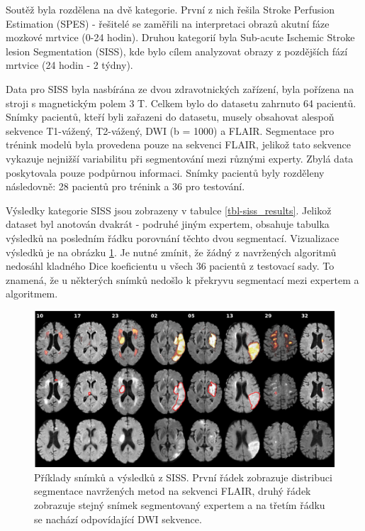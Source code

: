 \documentclass[11pt]{article}
\begin{document}
Soutěž byla rozdělena na dvě kategorie. První z nich řešila Stroke Perfusion Estimation (SPES) - řešitelé se zaměřili na interpretaci obrazů akutní fáze mozkové mrtvice (0-24 hodin). Druhou kategorií byla Sub-acute Ischemic Stroke lesion Segmentation (SISS), kde bylo cílem analyzovat obrazy z pozdějších fází mrtvice (24 hodin - 2 týdny).

Data pro SISS byla nasbírána ze dvou zdravotnických zařízení, byla pořízena na stroji s magnetickým polem 3 T. Celkem bylo do datasetu zahrnuto 64 pacientů. Snímky pacientů, kteří byli zařazeni do datasetu, musely obsahovat alespoň sekvence T1-vážený, T2-vážený, DWI (b = 1000) a FLAIR. Segmentace pro trénink modelů byla provedena pouze na sekvenci FLAIR, jelikož tato sekvence vykazuje nejnižší variabilitu při segmentování mezi různými experty. Zbylá data poskytovala pouze podpůrnou informaci. Snímky pacientů byly rozděleny následovně: 28 pacientů pro trénink a 36 pro testování.

Výsledky kategorie SISS jsou zobrazeny v tabulce \ref{tbl-siss_results}. Jelikož dataset byl anotován dvakrát - podruhé jiným expertem, obsahuje tabulka výsledků na posledním řádku porovnání těchto dvou segmentací. Vizualizace výsledků je na obrázku \ref{img-isles2015}. Je nutné zmínit, že žádný z navržených algoritmů nedosáhl kladného Dice koeficientu u všech 36 pacientů z testovací sady. To znamená, že u některých snímků nedošlo k překryvu segmentací mezi expertem a algoritmem.

\begin{figure}[htp]
	\centering
	\includegraphics[width=\textwidth]{isles2015}
	\caption{Příklady snímků a výsledků z SISS. První řádek zobrazuje distribuci segmentace navržených metod na sekvenci FLAIR, druhý řádek zobrazuje stejný snímek segmentovaný expertem a na třetím řádku se nachází odpovídající DWI sekvence.}
	\label{img-isles2015}
\end{figure}
\end{document}
